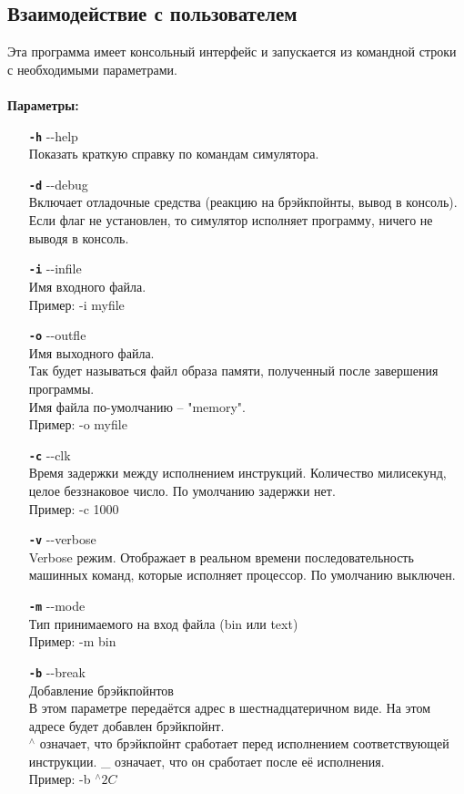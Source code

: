 \subsection{Взаимодействие с пользователем}
Эта программа имеет консольный интерфейс и запускается из командной строки с необходимыми параметрами.\\
~\\
{\bf Параметры:}
\begin{enumerate}
	\item[{\tt\bf -h}] {-}-help \\
	Показать краткую справку по командам симулятора.
	
	\item[{\tt\bf -d}] {-}-debug \\
	Включает отладочные средства (реакцию на брэйкпойнты, вывод в консоль).
	Если флаг не  установлен, то симулятор исполняет программу, ничего не выводя в консоль.
	
	\item[{\tt\bf -i}] {-}-infile \\
	Имя входного файла. \\
	Пример: -i myfile
	
	\item[{\tt\bf -o}] {-}-outfle \\
	Имя выходного файла. \\ 
	Так будет называться файл образа памяти, полученный после завершения программы.\\
	Имя файла по-умолчанию -- "memory".\\
	Пример: -o myfile
	
	\item[{\tt\bf -c}] {-}-clk \\
	Время задержки между исполнением инструкций. Количество милисекунд, целое беззнаковое число. По умолчанию задержки нет.\\
	Пример: -c 1000
	
	\item[{\tt\bf -v}] {-}-verbose \\
	Verbose режим. Отображает в реальном времени последовательность машинных команд, которые исполняет процессор. По умолчанию выключен.
	
	\item[{\tt\bf -m}] {-}-mode \\
	Тип принимаемого на вход файла (bin или text) \\
	Пример: -m bin
	
	\item[{\tt\bf -b}] {-}-break \\
	Добавление брэйкпойнтов \\
	В этом параметре передаётся адрес в шестнадцатеричном виде. На этом адресе будет добавлен брэйкпойнт. \\
	$^\wedge$ означает, что брэйкпойнт сработает перед исполнением соответствующей инструкции. \_ означает, что он сработает после её исполнения. \\
	Пример: -b $^\wedge2C$
	

\end{enumerate}
